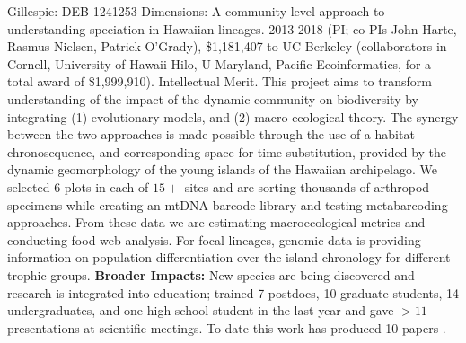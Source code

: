 \documentclass[11pt]{article}
\makeatletter
\renewcommand{\paragraph}{\@startsection{paragraph}{4}{\z@}
  {1ex \@plus 1ex \@minus .2ex}{-1em}
  {\normalfont\normalsize\it}
}
\makeatother
\begin{document}
 
\paragraph{Gillespie:} DEB 1241253 Dimensions: A community level
approach to understanding speciation in Hawaiian lineages. 2013-2018
(PI; co-PIs John Harte, Rasmus Nielsen, Patrick O’Grady), \$1,181,407
to UC Berkeley (collaborators in Cornell, University of Hawaii Hilo, U
Maryland, Pacific Ecoinformatics, for a total award of
\$1,999,910). Intellectual Merit. This project aims to transform
understanding of the impact of the dynamic community on biodiversity
by integrating (1) evolutionary models, and (2) macro-ecological
theory. The synergy between the two approaches is made possible
through the use of a habitat chronosequence, and corresponding
space-for-time substitution, provided by the dynamic geomorphology of
the young islands of the Hawaiian archipelago. We selected 6 plots in
each of $15+$ sites and are sorting thousands of arthropod specimens
while creating an mtDNA barcode library and testing metabarcoding
approaches. From these data we are estimating macroecological metrics
and conducting food web analysis. For focal lineages, genomic data is
providing information on population differentiation over the island
chronology for different trophic groups. {\bf Broader Impacts:} New
species are being discovered and research is integrated into
education; trained 7 postdocs, 10 graduate students, 14
undergraduates, and one high school student in the last year and gave
$> 11$ presentations at scientific meetings. To date this work has
produced 10 papers \citep{rominger2016, rominger2015,
  krehenwinkel2016, gillespie2014, shaw2016, gillespie2016,
  brewer2015, brewer2014, warren2015, gillespie2013}.
\end{document}
